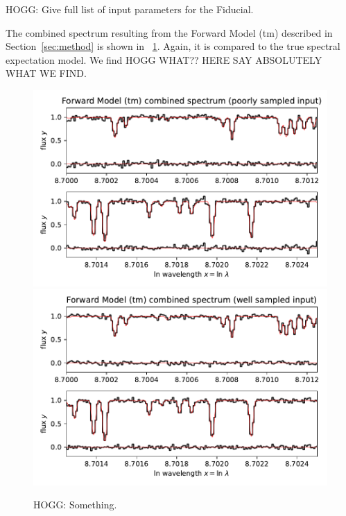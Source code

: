 \documentclass[11pt]{article}
\newlength{\figurewidth}
\newcommand{\sectionname}{Section}
\begin{document}
HOGG: Give full list of input parameters for the Fiducial.

The combined spectrum resulting from the Forward Model (tm) described in \sectionname~\ref{sec:method} is shown in \figurename~\ref{fig:forward}.
Again, it is compared to the true spectral expectation model.
We find HOGG WHAT?? HERE SAY ABSOLUTELY WHAT WE FIND.
\begin{figure}[t!]
    \begin{mdframed}\begin{center}
    \includegraphics[width=\figurewidth]{notebooks/forward1.pdf}\\
    \includegraphics[width=\figurewidth]{notebooks/forward2.pdf}
    \end{center}
    \caption{HOGG: Something.}
    \label{fig:forward}
    \end{mdframed}
\end{figure}
\end{document}
